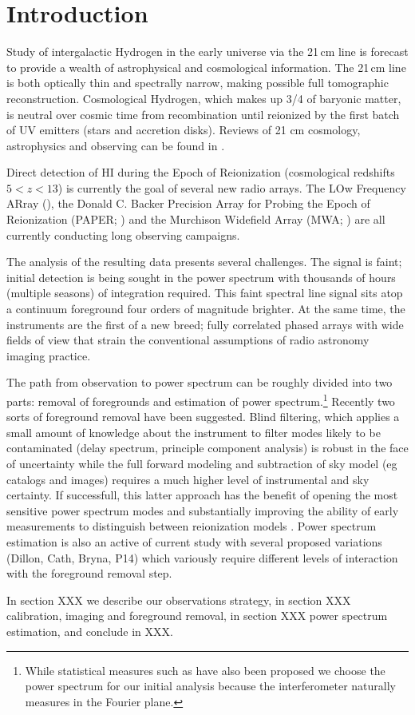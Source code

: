\section{Introduction} 
  Study of intergalactic Hydrogen  in the early universe via the 21\,cm line is forecast to provide a wealth of astrophysical and cosmological information.  The 21\,cm line is both optically thin and spectrally narrow, making possible full tomographic reconstruction. Cosmological Hydrogen, which makes up 3/4 of baryonic matter, is neutral over cosmic time from recombination until reionized by the first batch of UV emitters (stars and accretion disks).  Reviews of 21 cm cosmology, astrophysics and observing can be found in \cite{Morales:2010p8093,Furlanetto:2006p2267,Pritchard:2012p9555,zaroubi2013epoch}.
  
Direct detection of HI during the Epoch of Reionization (cosmological redshifts $5<z<13$) is currently the goal of several new radio arrays. The LOw Frequency ARray (), the Donald C. Backer Precision Array for Probing the Epoch of Reionization (PAPER; ) and the Murchison Widefield Array (MWA; ) are all currently conducting long observing campaigns.

The analysis of the resulting data presents several challenges. The signal is faint; initial detection is being sought in the power spectrum with thousands of hours (multiple seasons) of integration required. This faint spectral line signal sits atop a continuum foreground four orders of magnitude brighter. At the same time, the instruments are the first of a new breed; fully correlated phased arrays with wide fields of view that strain the conventional assumptions of radio astronomy imaging practice. 

The path from observation to power spectrum can be roughly divided into two parts: removal of foregrounds and estimation of power spectrum.\footnote{While statistical measures  such as \citet{Barkana:2008p2154} have also been proposed we choose the power spectrum for our initial analysis because the interferometer naturally measures in the Fourier plane.} Recently two sorts of foreground removal have been suggested. Blind filtering, which applies a small amount of knowledge about the instrument to filter modes likely to be contaminated (delay spectrum, principle component analysis) is robust in the face of uncertainty while the full forward modeling and subtraction of sky model (eg catalogs and images) requires a much higher level of instrumental and sky certainty. If successfull, this latter approach has the benefit of opening the most sensitive power spectrum modes and substantially improving the ability of early measurements to distinguish between reionization models \citep{Pober:2014p10390}.  Power spectrum estimation is also an active of current study with several proposed variations (Dillon, Cath, Bryna, P14) which variously require different levels of interaction with the foreground removal step.




In section XXX we describe our observations strategy, in section XXX calibration, imaging and foreground removal, in section XXX power spectrum estimation, and conclude in XXX.